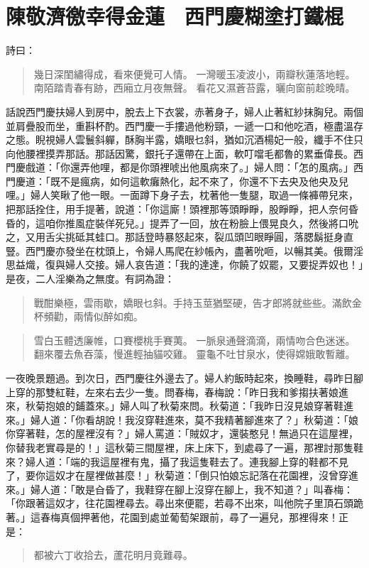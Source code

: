 
\chapter{陳敬濟徼幸得金蓮　西門慶糊塗打鐵棍}

詩曰：
\begin{quote}
幾日深閨繡得成，看來便覺可人情。
一灣暖玉凌波小，兩瓣秋蓮落地輕。
南陌踏青春有跡，西廂立月夜無聲。
看花又濕蒼苔露，曬向窗前趁晚晴。
\end{quote}

話說西門慶扶婦人到房中，脫去上下衣裳，赤著身子，婦人止著紅紗抹胸兒。兩個並肩疊股而坐，重斟杯酌。西門慶一手摟過他粉頸，一遞一口和他吃酒，極盡溫存之態。睨視婦人雲鬟斜軃，酥胸半露，嬌眼乜斜，猶如沉酒楊妃一般，纖手不住只向他腰裡摸弄那話。那話因驚，銀托子還帶在上面，軟叮噹毛都魯的累垂偉長。西門慶戲道：「你還弄他哩，都是你頭裡唬出他風病來了。」婦人問：「怎的風病。」西門慶道：「既不是瘋病，如何這軟癱熱化，起不來了，你還不下去央及他央及兒哩。」婦人笑瞅了他一眼。一面蹲下身子去，枕著他一隻腿，取過一條褲帶兒來，把那話拴住，用手提著，說道：「你這廝！頭裡那等頭睜睜，股睜睜，把人奈何昏昏的，這咱你推風症裝佯死兒。」提弄了一回，放在粉臉上偎晃良久，然後將口吮之，又用舌尖挑砥其蛙口。那話登時暴怒起來，裂瓜頭凹眼睜圓，落腮鬍挺身直豎。西門慶亦發坐在枕頭上，令婦人馬爬在紗帳內，盡著吮咂，以暢其美。俄爾淫思益熾，復與婦人交接。婦人哀告道：「我的達達，你饒了奴罷，又要捉弄奴也！」是夜，二人淫樂為之無度。有詞為證：
\begin{quote}
戰酣樂極，雲雨歇，嬌眼乜斜。手持玉莖猶堅硬，告才郎將就些些。滿飲金杯頻勸，兩情似醉如痴。
\end{quote}

\begin{quote}
雪白玉體透廉帷，口賽櫻桃手賽荑。
一脈泉通聲滴滴，兩情吻合色迷迷。
翻來覆去魚吞藻，慢進輕抽貓咬雞。
靈龜不吐甘泉水，使得嫦娥敢暫離。
\end{quote}

一夜晚景題過。到次日，西門慶往外邊去了。婦人約飯時起來，換睡鞋，尋昨日腳上穿的那雙紅鞋，左來右去少一隻。問春梅，春梅說：「昨日我和爹搊扶著娘進來，秋菊抱娘的鋪蓋來。」婦人叫了秋菊來問。秋菊道：「我昨日沒見娘穿著鞋進來。」婦人道：「你看胡說！我沒穿鞋進來，莫不我精著腳進來了？」秋菊道：「娘你穿著鞋，怎的屋裡沒有？」婦人罵道：「賊奴才，還裝憨兒！無過只在這屋裡，你替我老實尋是的！」這秋菊三間屋裡，床上床下，到處尋了一遍，那裡討那隻鞋來？婦人道：「端的我這屋裡有鬼，攝了我這隻鞋去了。連我腳上穿的鞋都不見了，要你這奴才在屋裡做甚麼！」秋菊道：「倒只怕娘忘記落在花園裡，沒曾穿進來。」婦人道：「敢是㒲昏了，我鞋穿在腳上沒穿在腳上，我不知道？」叫春梅：「你跟著這奴才，往花園裡尋去。尋出來便罷，若尋不出來，叫他院子里頂石頭跪著。」這春梅真個押著他，花園到處並葡萄架跟前，尋了一遍兒，那裡得來！正是：
\begin{quote}
都被六丁收拾去，蘆花明月竟難尋。
\end{quote}

